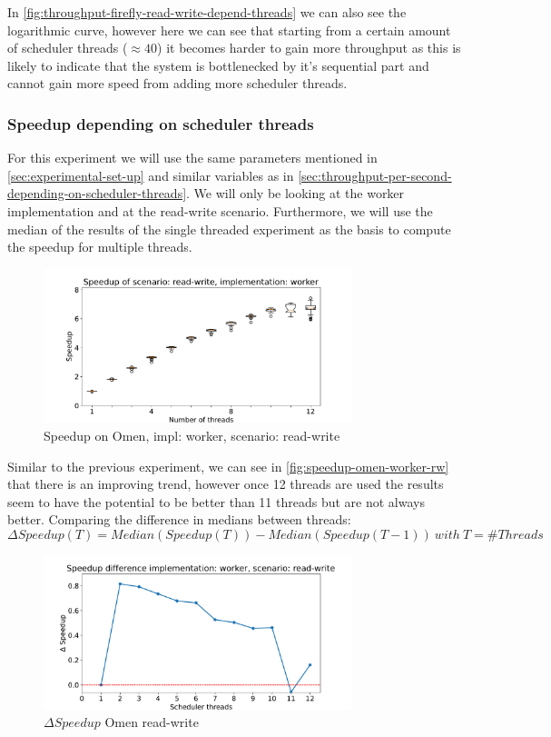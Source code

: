 \documentclass{article}
\begin{document}
In \autoref{fig:throughput-firefly-read-write-depend-threads} we can also see
the logarithmic curve, however here we can see that starting from a certain
amount of scheduler threads ($\approx 40$) it becomes harder to gain more
throughput as this is likely to indicate that the system is bottlenecked by it's
sequential part and cannot gain more speed from adding more scheduler threads.
\subsubsection{Speedup depending on scheduler threads}
For this experiment we will use the same parameters mentioned in
\autoref{sec:experimental-set-up} and similar variables as in
\autoref{sec:throughput-per-second-depending-on-scheduler-threads}. We will only
be looking at the worker implementation and at the read-write scenario.
Furthermore, we will use the median of the results of the single threaded
experiment as the basis to compute the speedup for multiple threads.
\begin{figure}[H]
	\centering
	\includegraphics[width=0.8\textwidth]{boxplots/omen/boxplot-speedup-of-scenario-read-write-implementation-worker.pdf}
	\caption{Speedup on Omen, impl: worker, scenario: read-write}
	\label{fig:speedup-omen-worker-rw}
\end{figure}
Similar to the previous experiment, we can see in \autoref{fig:speedup-omen-worker-rw} that there is an improving trend, however once
12 threads are used the results seem to have the potential to be better than 11
threads but are not always better.
Comparing the difference in medians between threads: $$\Delta Speedup(T) =
	Median(Speedup(T)) - Median(Speedup(T - 1))\:with\:T=\#Threads$$
\begin{figure}[H]
	\centering
	\includegraphics[width=0.8\textwidth]{plot/omen/plot-speedup-difference-implementation-worker-scenario-read-write.pdf}
	\caption{$\Delta Speedup$ Omen read-write}
	\label{fig:delta-speedup-omen-rw}
\end{figure}
\end{document}
